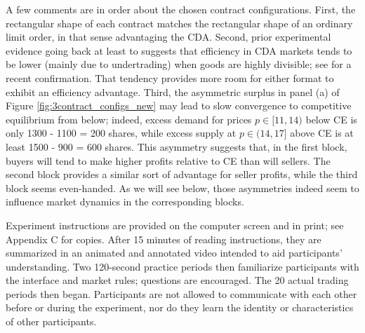 \documentclass[12pt]{article}
\begin{document}
A few comments are in order about the chosen contract configurations. 
First, the rectangular shape of each contract matches the rectangular shape of an ordinary limit order, in that sense advantaging the CDA. %
Second, prior experimental evidence 
going back at least to \cite{friedman1995competitivity} suggests that efficiency in CDA markets tends to be lower (mainly due to undertrading) when goods are highly divisible; see \cite{angereretal}
for a recent confirmation.
That tendency provides more room for either format to exhibit an efficiency advantage.
Third, the asymmetric surplus in panel (a) of Figure \ref{fig:3contract_configs_new} may lead to slow convergence to competitive equilibrium from below; indeed, excess demand for prices $p \in [11,14)$ below CE is only 1300 - 1100 = 200 shares, while excess supply at $p \in (14, 17]$ above CE is at least 1500 - 900 = 600 shares.
This asymmetry suggests that, in the first block, buyers will tend to make higher profits relative to CE than will sellers.
The second block provides a similar sort of advantage for seller profits, while the third block seems even-handed. As we will see below, those asymmetries indeed seem to influence market dynamics in the corresponding blocks. 


Experiment instructions are provided on the computer screen and in print; see Appendix C for copies. %
After 15 minutes of reading instructions, they are summarized in an animated and annotated video intended to aid participants' understanding. 
Two 120-second practice periods then familiarize participants with the interface and market rules; questions
are encouraged. 
The 20 actual trading periods then began.
Participants are not allowed to communicate with each other before or during the experiment, nor do they learn the identity or characteristics of other participants.
\end{document}
